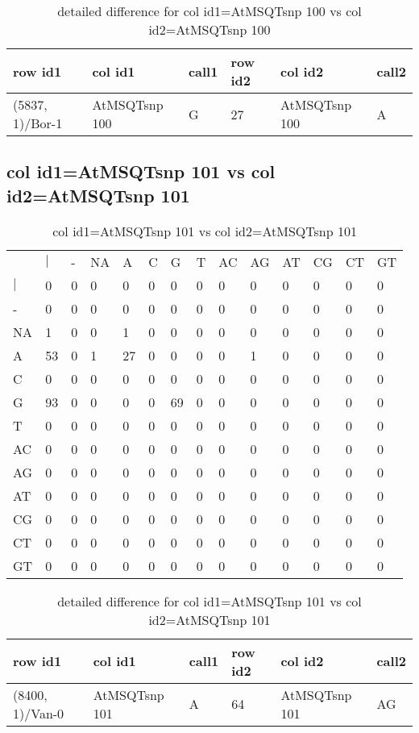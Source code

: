 \begin{center}
\begin{longtable}{|l|l|l|l|l|l|}
\caption{detailed difference for col id1=AtMSQTsnp 100 vs col id2=AtMSQTsnp 100} \label{table_dm497}\\
\hline
row id1&col id1&call1&row id2&col id2&call2\\
\hline
(5837, 1)/Bor-1&AtMSQTsnp 100&G&27&AtMSQTsnp 100&A\\
\hline
\end{longtable}
\end{center}

\subsection{col id1=AtMSQTsnp 101 vs col id2=AtMSQTsnp 101}
\begin{center}
\begin{longtable}{|l|l|l|l|l|l|l|l|l|l|l|l|l|l|}
\caption{col id1=AtMSQTsnp 101 vs col id2=AtMSQTsnp 101} \label{table_dm498}\\
\hline
\\
\hline
&$|$&-&NA&A&C&G&T&AC&AG&AT&CG&CT&GT\\
$|$&0&0&0&0&0&0&0&0&0&0&0&0&0\\
-&0&0&0&0&0&0&0&0&0&0&0&0&0\\
NA&1&0&0&1&0&0&0&0&0&0&0&0&0\\
A&53&0&1&27&0&0&0&0&1&0&0&0&0\\
C&0&0&0&0&0&0&0&0&0&0&0&0&0\\
G&93&0&0&0&0&69&0&0&0&0&0&0&0\\
T&0&0&0&0&0&0&0&0&0&0&0&0&0\\
AC&0&0&0&0&0&0&0&0&0&0&0&0&0\\
AG&0&0&0&0&0&0&0&0&0&0&0&0&0\\
AT&0&0&0&0&0&0&0&0&0&0&0&0&0\\
CG&0&0&0&0&0&0&0&0&0&0&0&0&0\\
CT&0&0&0&0&0&0&0&0&0&0&0&0&0\\
GT&0&0&0&0&0&0&0&0&0&0&0&0&0\\
\hline
\end{longtable}
\end{center}

\begin{center}
\begin{longtable}{|l|l|l|l|l|l|}
\caption{detailed difference for col id1=AtMSQTsnp 101 vs col id2=AtMSQTsnp 101} \label{table_dm499}\\
\hline
row id1&col id1&call1&row id2&col id2&call2\\
\hline
(8400, 1)/Van-0&AtMSQTsnp 101&A&64&AtMSQTsnp 101&AG\\
\hline
\end{longtable}
\end{center}

